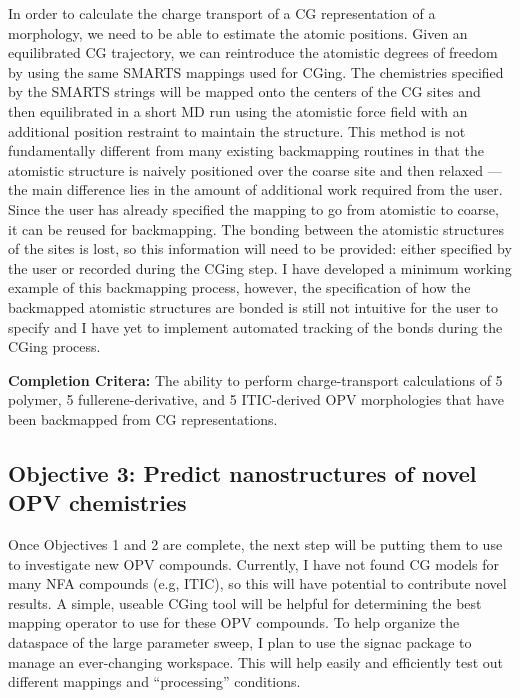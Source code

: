 In order to calculate the charge transport of a CG representation of a morphology, we need to be able to estimate the atomic positions.
Given an equilibrated CG trajectory, we can reintroduce the atomistic degrees of freedom by using the same SMARTS mappings used for CGing.
The chemistries specified by the SMARTS strings will be mapped onto the centers of the CG sites and then equilibrated in a short MD run using the atomistic force field with an additional position restraint to maintain the structure. 
This method is not fundamentally different from many existing backmapping routines in that the atomistic structure is naively positioned over the coarse site and then relaxed --- the main difference lies in the amount of additional work required from the user\cite{Wassenaar2014b, MorphCT, Ruhle2009}.
Since the user has already specified the mapping to go from atomistic to coarse, it can be reused for backmapping.
The bonding between the atomistic structures of the sites is lost, so this information will need to be provided: either specified by the user or recorded during the CGing step.
I have developed a minimum working example of this backmapping process\cite{grits},
however, the specification of how the backmapped atomistic structures are bonded is still not intuitive for the user to specify and I have yet to implement automated tracking of the bonds during the CGing process.

\textbf{Completion Critera:} The ability to perform charge-transport calculations of 5 polymer, 5 fullerene-derivative, and 5 ITIC-derived OPV morphologies that have been backmapped from CG representations.

\subsection*{Objective 3: Predict nanostructures of novel OPV chemistries}

Once Objectives 1 and 2 are complete, the next step will be putting them to use to investigate new OPV compounds. 
Currently, I have not found CG models for many NFA compounds (e.g, ITIC), so this will have potential to contribute novel results. %
A simple, useable CGing tool will be helpful for determining the best mapping operator to use for these OPV compounds.
To help organize the dataspace of the large parameter sweep, I plan to use the signac package to manage an ever-changing workspace.
This will help easily and efficiently test out different mappings and ``processing'' conditions.

